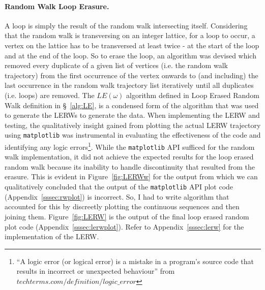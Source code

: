 \documentclass{article}
\begin{document}
\paragraph{Random Walk Loop Erasure.} A loop is simply the result of the random walk intersecting itself. Considering that the random walk is transversing on an integer lattice, for a loop to occur, a vertex on the lattice has to be transversed at least twice - at the start of the loop and at the end of the loop. So to erase the loop, an algorithm was devised which removed every duplicate of a given list of vertices (i.e. the random walk trajectory) from the first occurrence of the vertex onwards to (and including) the last occurrence in the random walk trajectory list iteratively until all duplicates (i.e. loops) are removed. The $LE(\omega)$ algorithm defined in Loop Erased Random Walk definition in \S~\ref{alg:LE}, is a condensed form of the algorithm that was used to generate the LERWs to generate the data. When implementing the LERW and testing, the qualitatively insight gained from plotting the actual LERW trajectory using \texttt{matplotlib} was instrumental in evaluating the effectiveness of the code and identifying any logic errors\footnote{``A logic error (or logical error) is a mistake in a program's source code that results in incorrect or unexpected behaviour'' from $techterms.com/definition/logic\_error$}. While the \texttt{matplotlib} API sufficed for the random walk implementation, it did not achieve the expected results for the loop erased random walk because its inability to handle discontinuity that resulted from the erasure. This is evident in Figure~\ref{fig:LERWw} for the output from which we can qualitatively concluded that the output of the \texttt{matplotlib} API plot code (Appendix~\ref{sssec:rwplot}) is incorrect. So, I had to write algorithm that accounted for this by discreetly plotting the continuous sequences and then joining them. Figure~\ref{fig:LERW} is the output of the final loop erased random plot code (Appendix~\ref{sssec:lerwplot}).
Refer to Appendix~\ref{sssec:lerw} for the implementation of the LERW.
\end{document}
